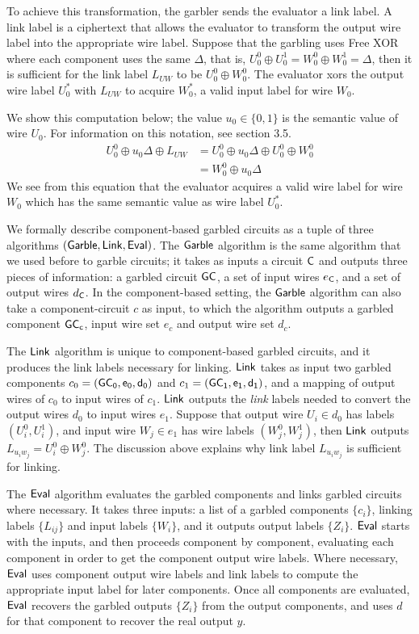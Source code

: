 

To achieve this transformation, the garbler sends the evaluator a link label.
A link label is a ciphertext that allows the evaluator to transform the output wire label into the appropriate wire label. 
Suppose that the garbling uses Free XOR where each component uses the same $\Delta$, that is, $U_0^0 \oplus U_0^1 = W_0^0 \oplus W_0^1 = \Delta$, then it is sufficient for the link label $L_{UW}$ to be $U_0^0 \oplus W_0^0$.
The evaluator xors the output wire label $U_0^*$ with $L_{UW}$ to acquire $W_0^*$, a valid input label for wire $W_0$. 

We show this computation below; the value $u_0 \in \{0,1\}$ is the semantic value of wire $U_0$.
For information on this notation, see section 3.5. 
\begin{align}
	U_0^0 \oplus u_0 \Delta \oplus L_{UW} & = U_0^0 \oplus u_0 \Delta \oplus U_0^0 \oplus W_0^0 \\
	& = W_0^0 \oplus u_0 \Delta
\end{align}
We see from this equation that the evaluator acquires a valid wire label for wire $W_0$ which has the same semantic value as wire label $U_0^*$.

We formally describe component-based garbled circuits as a tuple of three algorithms $(\sf{Garble}, \sf{Link}, \sf{Eval})$.
The $\sf{Garble}$ algorithm is the same algorithm that we used before to garble circuits; it takes as inputs a circuit $\sf {C}$ and outputs three pieces of information: a garbled circuit $\sf {GC}$, a set of input wires $e_{\sf {C}}$, and a set of output wires $d_{\sf {C}}$.
In the component-based setting, the $\sf{Garble}$ algorithm can also take a component-circuit $c$ as input, to which the algorithm outputs a garbled component $\sf {GC}_c$, input wire set $e_c$ and output wire set $d_c$. 

The $\sf{Link}$ algorithm is unique to component-based garbled circuits, and it produces the link labels necessary for linking.
$\sf{Link}$ takes as input two garbled components $c_0 = (\sf {GC}_0, e_0, d_0)$ and $c_1 = (\sf {GC}_1, e_1, d_1)$, and a mapping of output wires of $c_0$ to input wires of $c_1$. 
$\sf{Link}$ outputs the \textit{link} labels needed to convert the output wires $d_0$ to input wires $e_1$. 
Suppose that output wire $U_i \in d_0$ has labels $(U_i^0, U_i^1)$, and input wire $W_j \in e_1$ has wire labels $(W_j^0, W_j^1)$, then $\sf{Link}$ outputs $L_{u_i w_j} = U_i^0 \oplus W_j^0$. 
The discussion above explains why link label $L_{u_i w_j}$ is sufficient for linking. 

The $\sf{Eval}$ algorithm evaluates the garbled components and links garbled circuits where necessary.
It takes three inputs: a list of a garbled components $\{c_i\}$, linking labels $\{L_{ij}\}$ and input labels $\{W_i\}$, and it outputs output labels $\{Z_i\}$. 
$\sf{Eval}$ starts with the inputs, and then proceeds component by component, evaluating each component in order to get the component output wire labels.
Where necessary, $\sf{Eval}$ uses component output wire labels and link labels to compute the appropriate input label for later components. 
Once all components are evaluated, $\sf{Eval}$ recovers the garbled outputs $\{Z_i\}$ from the output components, and uses $d$ for that component to recover the real output $y$. 

